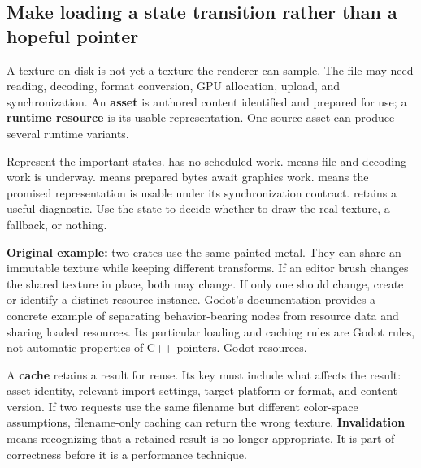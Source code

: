 \subsection{Make loading a state transition rather than a hopeful pointer}\label{06-engine-ii-ch027-make-loading-a-state-transition-rather-than-a-hopeful-pointer}

\hypertarget{06-engine-ii-ch027-make-loading-a-state-transition-rather-than-a-hopeful-pointer}{}

A texture on disk is not yet a texture the renderer can sample. The file may need reading, decoding, format conversion, GPU allocation, upload, and synchronization. An \textbf{asset} is authored content identified and prepared for use; a \textbf{runtime resource} is its usable representation. One source asset can produce several runtime variants.

Represent the important states.  has no scheduled work.  means file and decoding work is underway.  means prepared bytes await graphics work.  means the promised representation is usable under its synchronization contract.  retains a useful diagnostic. Use the state to decide whether to draw the real texture, a fallback, or nothing.


\textbf{Original example:} two crates use the same painted metal. They can share an immutable texture while keeping different transforms. If an editor brush changes the shared texture in place, both may change. If only one should change, create or identify a distinct resource instance. Godot's documentation provides a concrete example of separating behavior-bearing nodes from resource data and sharing loaded resources. Its particular loading and caching rules are Godot rules, not automatic properties of C++ pointers. \href{https://docs.godotengine.org/en/stable/tutorials/scripting/resources.html}{Godot resources}.

A \textbf{cache} retains a result for reuse. Its key must include what affects the result: asset identity, relevant import settings, target platform or format, and content version. If two requests use the same filename but different color-space assumptions, filename-only caching can return the wrong texture. \textbf{Invalidation} means recognizing that a retained result is no longer appropriate. It is part of correctness before it is a performance technique.

